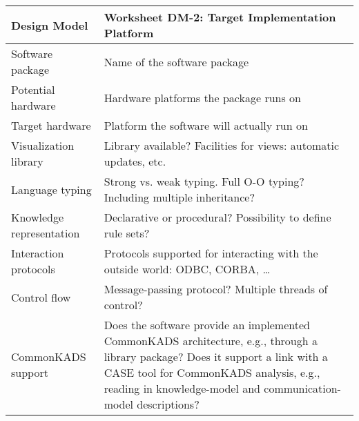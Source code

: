 \begin{tabular}{%
	|>{\colleft}p{3cm}%
	|>{\colleft}p{8cm}|}
\hline
\bf Design Model 	& \bf Worksheet DM-2: Target Implementation Platform \\
\hline\hline
\sc Software package & 
Name of the software package 
\\  \hline
\sc Potential hardware & 
Hardware platforms the package runs on
\\ \hline
\sc Target hardware & 
Platform the software will actually run on
\\ \hline
\sc Visualization library &
Library available? Facilities for views: automatic updates, etc. 
\\ \hline
\sc Language typing &
Strong vs. weak typing. 
Full O-O typing?  Including multiple inheritance? 
\\ \hline
\sc Knowledge representation & 
Declarative or procedural?
Possibility to define rule sets?
\\ \hline
\sc Interaction protocols &
Protocols supported for interacting with the outside world: ODBC,
CORBA, \ldots 
\\ \hline
\sc Control flow &
Message-passing protocol? Multiple threads of control?
\\ \hline 
\sc CommonKADS support &
Does the software provide an implemented CommonKADS architecture,
e.g., through a library package? Does it support a link with a CASE
tool for CommonKADS analysis, e.g., reading in knowledge-model and
communication-model descriptions?
\\ \hline
\end{tabular}
